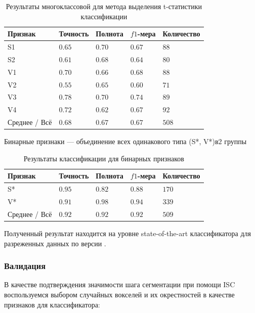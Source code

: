 \begin{table}%
	\caption{Результаты многоклассовой для метода выделения t-статистики классификации}\label{tbl:mul_tstat_res}%
	\centering
	\begin{tabu}{|X[1.1]|X|X|X|X|}
		\hline
		Признак       & Точность & Полнота & $f1$-мера & Количество \\ \hline
		S1            &$ 0.65$     &$ 0.70$    &$ 0.67$      &$ 88$         \\ \hline
		S2            &$ 0.61$     &$ 0.68$    &$ 0.64$      &$ 80$         \\ \hline
		V1            &$ 0.70$     &$ 0.66$    &$ 0.68$      &$ 88$         \\ \hline
		V2            &$ 0.55$     &$ 0.65$    &$ 0.60$      &$ 71$         \\ \hline
		V3            &$ 0.78$     &$ 0.70$    &$ 0.74$      &$ 89$         \\ \hline
		V4            &$ 0.72$     &$ 0.62$    &$ 0.67$      &$ 92$         \\ \hline
		Среднее / Всё &$ 0.68$     &$ 0.67$    &$ 0.67$      &$ 508$        \\ \hline
	\end{tabu}
\end{table}


Бинарные признаки --- объединение всех одинакового типа (S*, V*)в$ 2$ группы

\begin{table}%
	\caption{Результаты классификации для бинарных признаков}\label{tbl:bin_res}%
	\centering
\begin{tabu}{|X[1.1]|X|X|X|X|}
	\hline
	Признак               & Точность & Полнота   & $f1$-мера & Количество \\ \hline
	S*                    & $0.95 $  & $ 0.82$   & $0.88$    & $ 170$     \\ \hline
	V*                    & $ 0.91 $ & $  0.98 $ & $ 0.94 $  & $  339$    \\ \hline
	Среднее / Всё & $0.92$   & $0.92 $   & $0.92$    & $509$      \\ \hline
\end{tabu}
\end{table}
Полученный результат находится на уровне state-of-the-art классификатора для разреженных данных по версии \cite{zhang2013some}.

\subsubsection*{Валидация}
В качестве подтверждения значимости шага сегментации при помощи ISC воспользуемся выбором случайных вокселей и их окрестностей в качестве признаков для классификатора:

